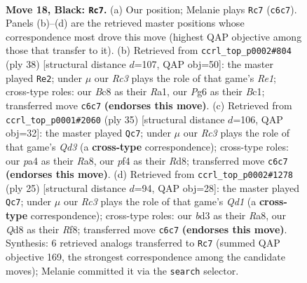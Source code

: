 \documentclass[11pt]{article}
\begin{document}
\clearpage

\begin{figure}[p]\centering
\begin{subfigure}{0.46\textwidth}\centering
\resizebox{\linewidth}{!}{%
\newchessgame
\chessboard[
  setfen={rnbq2k1/p4p2/1pr2np1/3p2Np/PP1P1P1P/R1NB2P1/3K4/3Q3R b - - 0 18},
  showmover=false,
  pgfstyle=straightmove, color=movearrow, markmove={c6-c7}
]}
\caption{}
\end{subfigure}\hfill
\begin{subfigure}{0.46\textwidth}\centering
\resizebox{\linewidth}{!}{%
\newchessgame
\chessboard[
  setfen={r2q1r2/pp2n1pk/2pb3p/3p1p2/P2PnP2/2PB1NP1/1P5P/R1BQR1K1 w - - 5 20},
  showmover=false,
  pgfstyle=straightmove, color=movearrow, markmove={e1-e2}
]}
\caption{}
\end{subfigure}
\\[4pt]
\begin{subfigure}{0.46\textwidth}\centering
\resizebox{\linewidth}{!}{%
\newchessgame
\chessboard[
  setfen={r2r2k1/1p2npp1/2pq3p/p2pNb2/P2P4/1Q2P3/1P2BPPP/2R1R1K1 b - - 0 18},
  showmover=false,
  pgfstyle=straightmove, color=movearrow, markmove={d6-c7}
]}
\caption{}
\end{subfigure}\hfill
\begin{subfigure}{0.46\textwidth}\centering
\resizebox{\linewidth}{!}{%
\newchessgame
\chessboard[
  setfen={r1bq1rk1/pp3p2/2n1pn1p/3p2p1/3P4/2NBPNPP/PP4P1/R2QK2R b KQ - 0 13},
  showmover=false,
  pgfstyle=straightmove, color=movearrow, markmove={d8-c7}
]}
\caption{}
\end{subfigure}
\caption{\textbf{Move 18, Black: \texttt{Rc7}.} (a) Our position; Melanie plays \texttt{Rc7} (\texttt{c6c7}). Panels (b)--(d) are the retrieved master positions whose correspondence most drove this move (highest QAP objective among those that transfer to it). (b) Retrieved from \texttt{ccrl\_top\_p0002\#804} (ply 38) [structural distance $d$=107, QAP obj=50]: the master played \texttt{Re2}; under $\mu$ our \emph{Rc3} plays the role of that game's \emph{Re1}; cross-type roles: our \emph{B}c8 as their \emph{R}a1, our \emph{P}g6 as their \emph{B}c1; transferred move \texttt{c6c7} \textbf{(endorses this move)}. (c) Retrieved from \texttt{ccrl\_top\_p0001\#2060} (ply 35) [structural distance $d$=106, QAP obj=32]: the master played \texttt{Qc7}; under $\mu$ our \emph{Rc3} plays the role of that game's \emph{Qd3} (a \textbf{cross-type} correspondence); cross-type roles: our \emph{p}a4 as their \emph{R}a8, our \emph{p}f4 as their \emph{R}d8; transferred move \texttt{c6c7} \textbf{(endorses this move)}. (d) Retrieved from \texttt{ccrl\_top\_p0002\#1278} (ply 25) [structural distance $d$=94, QAP obj=28]: the master played \texttt{Qc7}; under $\mu$ our \emph{Rc3} plays the role of that game's \emph{Qd1} (a \textbf{cross-type} correspondence); cross-type roles: our \emph{b}d3 as their \emph{R}a8, our \emph{Q}d8 as their \emph{R}f8; transferred move \texttt{c6c7} \textbf{(endorses this move)}. Synthesis: 6 retrieved analogs transferred to \texttt{Rc7} (summed QAP objective 169, the strongest correspondence among the candidate moves); Melanie committed it via the \texttt{search} selector.}
\label{fig:thought-m35}
\end{figure}
\end{document}
